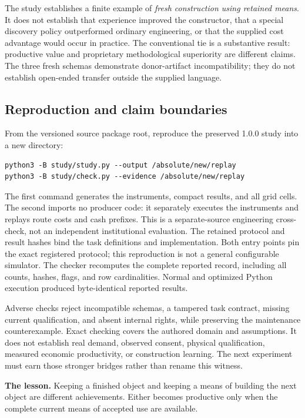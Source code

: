 The study establishes a finite example of \emph{fresh construction using retained
means}. It does not establish that experience improved the constructor, that a
special discovery policy outperformed ordinary engineering, or that the supplied
cost advantage would occur in practice. The conventional tie is a substantive
result: productive value and proprietary methodological superiority are different
claims. The three fresh schemas demonstrate donor-artifact incompatibility; they
do not establish open-ended transfer outside the supplied language.

\subsection{Reproduction and claim boundaries}

From the versioned source package root, reproduce the preserved 1.0.0 study into a new directory:
\begin{lstlisting}
python3 -B study/study.py --output /absolute/new/replay
python3 -B study/check.py --evidence /absolute/new/replay
\end{lstlisting}
The first command generates the instruments, compact results, and all grid cells.
The second imports no producer code: it separately executes the instruments and
replays route costs and cash prefixes. This is a separate-source engineering
cross-check, not an independent institutional evaluation. The retained protocol
and result hashes bind the task definitions and implementation. Both entry
points pin the exact registered protocol; this reproduction is not a general
configurable simulator. The checker recomputes the complete reported record,
including all counts, hashes, flags, and row cardinalities. Normal and
optimized Python execution produced byte-identical reported results.

Adverse checks reject incompatible schemas, a tampered task contract, missing
current qualification, and absent internal rights, while preserving the
maintenance counterexample. Exact checking covers the authored domain and
assumptions. It does not establish real demand, observed consent, physical
qualification, measured economic productivity, or construction learning. The
next experiment must earn those stronger bridges rather than rename this witness.

\begin{thesisbox}
\textbf{The lesson.} Keeping a finished object and keeping a means of building
the next object are different achievements. Either becomes productive only when
the complete current means of accepted use are available.
\end{thesisbox}
